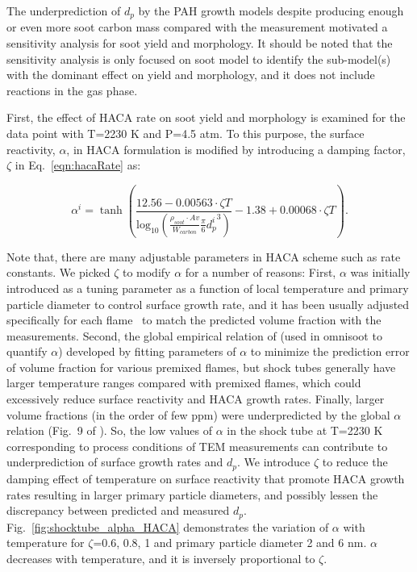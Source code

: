 The underprediction of $d_p$ by the PAH growth models despite producing enough or even more soot carbon mass compared with the measurement motivated a sensitivity analysis for soot yield and morphology.%
It should be noted that the sensitivity analysis is only focused on soot model to identify the sub-model(s) with the dominant effect on yield and morphology, and it does not include reactions in the gas phase.

First, the effect of HACA rate on soot yield and morphology is examined for the data point with T=2230 K and P=4.5 atm. To this purpose, the surface reactivity, $\alpha$, in HACA formulation is modified by introducing a damping factor, $\zeta$ in Eq.~\eqref{eqn:hacaRate} as:

\begin{equation}
	\alpha^i = \tanh 
	\left(
	\frac{12.56 - 0.00563\cdot \zeta T}
	{\mbox{log}_{10}
		\left( \frac{\rho_{soot}\cdot Av}{W_{carbon}} \frac{\pi}{6}{d^i_p}^3 \right) } -1.38+0.00068\cdot \zeta T
	\right)
	\label{eqn:alpha_modified}.
\end{equation}

Note that, there are many adjustable parameters in HACA scheme such as rate constants. We picked $\zeta$ to modify $\alpha$ for a number of reasons: First, $\alpha$ was initially introduced as a tuning parameter as a function of local temperature and primary particle diameter to control surface growth rate, and it has been usually adjusted specifically for each flame~\citep{castaldi1996pah, xu1997soot} to match the predicted volume fraction with the measurements. Second, the global empirical relation of \citet{appel2000kinetic} (used in omnisoot to quantify $\alpha$) developed by fitting parameters of $\alpha$ to minimize the prediction error of volume fraction for various premixed flames, but shock tubes generally have larger temperature ranges compared with premixed flames, which could excessively reduce surface reactivity and HACA growth rates. Finally, larger volume fractions (in the order of few ppm) were underpredicted by the global $\alpha$ relation (Fig.~9 of \citep{appel2000kinetic}). So, the low values of $\alpha$ in the shock tube at T=2230 K corresponding to process conditions of TEM measurements can contribute to underprediction of surface growth rates and $d_p$. We introduce $\zeta$ to reduce the damping effect of temperature on surface reactivity that promote HACA growth rates resulting in larger primary particle diameters, and possibly lessen the discrepancy between predicted and measured $d_p$. Fig.~\ref{fig:shocktube_alpha_HACA} demonstrates the variation of $\alpha$ with temperature for $\zeta$=0.6, 0.8, 1 and primary particle diameter 2 and 6 nm. $\alpha$ decreases with temperature, and it is inversely proportional to $\zeta$. 

